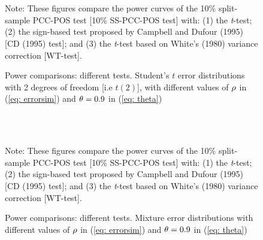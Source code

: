 \documentclass[harvard,11pt]{article}
\begin{document}
\begin{figure}[tbph]
\caption{Power comparisons: different tests. Student's $t$ error distributions with 2 degrees of freedom [i.e $t(2)$], with
different values of $\protect\rho $ in (\protect\ref{eq: errorsim}) and $\protect%
\theta =0.9$ in (\protect\ref{eq: theta})}
\begin{center}
 \\[0pt]
\\[0pt]
\end{center}
\doublespacing
Note: These figures compare the power curves of the 10\% split-sample PCC-POS test
[10\% SS-PCC-POS test] with: (1) the \textit{t}-test; (2) the sign-based test
proposed by Campbell and Dufour (1995) [CD (1995) test]; and (3) the \textit{t}-test based
on White's (1980) variance correction [WT-test]. 
\label{fig: Sim39}
\end{figure}



\begin{figure}[tbph]
\caption{Power comparisons: different tests. Mixture error distributions with
different values of $\protect\rho $ in (\protect\ref{eq: errorsim}) and $\protect%
\theta =0.9$ in (\protect\ref{eq: theta})}
\begin{center}
 \\[0pt]
\\[0pt]
\end{center}
\doublespacing
Note: These figures compare the power curves of the 10\% split-sample PCC-POS test
[10\% SS-PCC-POS test] with: (1) the \textit{t}-test; (2) the sign-based test
proposed by Campbell and Dufour (1995) [CD (1995) test]; and (3) the \textit{t}-test based
on White's (1980) variance correction [WT-test].
\label{fig: Sim410}
\end{figure}
\end{document}
